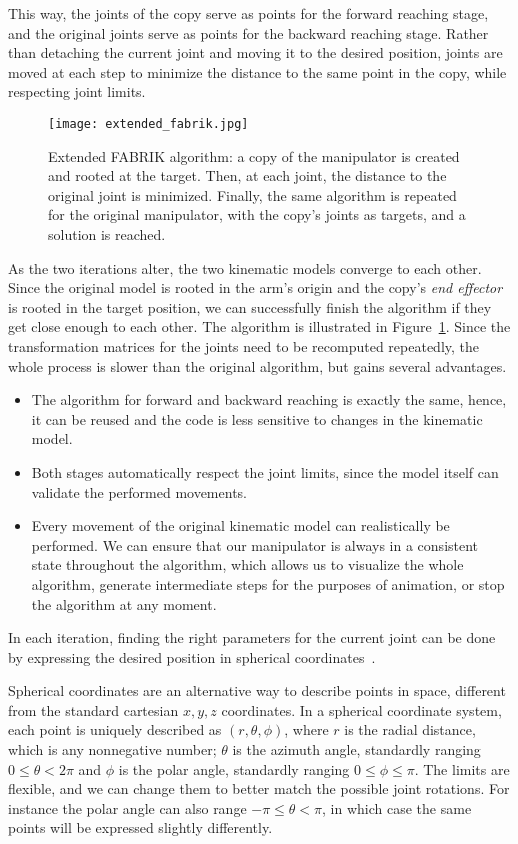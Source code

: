 This way, the joints of the copy serve as points for the forward reaching stage, and the original joints serve as points for the backward reaching stage. Rather than detaching the current joint and moving it to the desired position, joints are moved at each step to minimize the distance to the same point in the copy, while respecting joint limits.

\begin{figure}
  \centering
  \texttt{[image: extended\_fabrik.jpg]}
  \caption{Extended FABRIK algorithm: a copy of the manipulator is created and rooted at the target. Then, at each joint, the distance to the original joint is minimized. Finally, the same algorithm is repeated for the original manipulator, with the copy's joints as targets, and a solution is reached.}\label{fig:ext_fab}
\end{figure}

As the two iterations alter, the two kinematic models converge to each other. Since the original model is rooted in the arm's origin and the copy's \textit{end effector} is rooted in the target position, we can successfully finish the algorithm if they get close enough to each other. The algorithm is illustrated in Figure~\ref{fig:ext_fab}. Since the transformation matrices for the joints need to be recomputed repeatedly, the whole process is slower than the original algorithm, but gains several advantages.

\begin{itemize}
  \item The algorithm for forward and backward reaching is exactly the same, hence, it can be reused and the code is less sensitive to changes in the kinematic model.
  \item Both stages automatically respect the joint limits, since the model itself can validate the performed movements.
  \item Every movement of the original kinematic model can realistically be performed. We can ensure that our manipulator is always in a consistent state throughout the algorithm, which allows us to visualize the whole algorithm, generate intermediate steps for the purposes of animation, or stop the algorithm at any moment.
\end{itemize}

In each iteration, finding the right parameters for the current joint can be done by expressing the desired position in spherical coordinates~\cite{spherical}.

Spherical coordinates are an alternative way to describe points in space, different from the standard cartesian $x, y, z$ coordinates. In a spherical coordinate system, each point is uniquely described as $(r, \theta, \phi)$, where $r$ is the radial distance, which is any nonnegative number; $\theta$ is the azimuth angle, standardly ranging $0 \leq \theta < 2\pi$ and $\phi$ is the polar angle, standardly ranging $0 \leq \phi \leq \pi$. The limits are flexible, and we can change them to better match the possible joint rotations. For instance the polar angle can also range $-\pi \le \theta < \pi$, in which case the same points will be expressed slightly differently.


